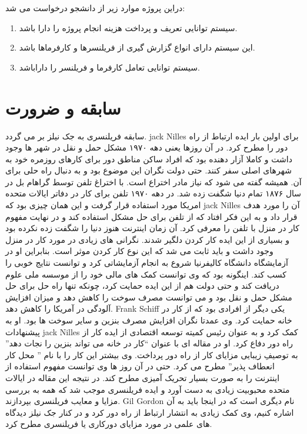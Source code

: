دراین پروژه موارد زیر از دانشجو درخواست می شد:
\begin{enumerate}
	\item
سیستم توانایی تعریف و پرداخت هزینه انجام پروژه را دارا باشد.
\item
این سیستم دارای انواع گزارش گیری از فریلنسرها و کارفرماها باشد.
\item
سیستم توانایی تعامل کارفرما و فریلنسر را داراباشد.
\end{enumerate}

\section{سابقه و ضرورت}
سابقه فریلنسری به جک نیلز بر می گردد. jack Nilles برای اولین بار ایده ارتباط از راه دور را مطرح کرد. در آن روزها یعنی دهه ۱۹۷۰ مشکل حمل و نقل در شهر ها وجود داشت و کاملا آزار دهنده بود که افراد ساکن مناطق دور برای کارهای روزمره خود به شهرهای اصلی سفر کنند. حتی دولت نگران این موضوع بود و به دنبال راه حلی برای آن. همیشه گفته می شود که نیاز مادر اختراع است.  با اختراغ تلفن توسط گراهام بل در سال ۱۸۷۶ تمام دنیا شگفت زده شد. در دهه ۱۹۷۰ تلفن برای کار در دفاتر ایالات متحده امریکا مورد استفاده قرار گرفت و این همان چیزی بود که jack Nilles آن را مورد هدف قرار داد و به این فکر افتاد که از تلفن برای حل مشکل استفاده کند و در نهایت مفهوم کار در منزل با تلفن را معرفی کرد. آن زمان اینترنت هنوز دنیا را شگفت زده نکرده بود و بسیاری از این ایده کار کردن دلگیر شدند. نگرانی های زیادی در مورد کار در منزل وجود داشت و باید ثابت می شد که این نوع کار کردن موثر است. بنابراین او در آزمایشگاه دانشگاه کالیفرنیا شروع به انجام آزمایشاتی کرد و توانست نتایج خوبی را کسب کند. اینگونه بود که وی توانست کمک های مالی خود را از موسسه ملی علوم دریافت کند و حتی دولت هم از این ایده حمایت کرد، چونکه تنها راه حل برای حل مشکل حمل و نقل بود و می توانست مصرف سوخت را کاهش دهد و میزان افزایش آلودگی در آمریکا را کاهش دهد.
Frank Schiff یکی دیگر از افرادی بود که از کار در خانه حمایت کرد. وی عمدتا نگران افزایش مصرف بنزین و سایر سوخت ها بود. او به پیشنهادات jack Nilles کمک کرد و به عنوان رئیس کمیته توسعه اقتصادی از ایده کار از راه دور دفاع کرد. او در مقاله ای با عنوان “کار در خانه می تواند بنزین را نجات دهد” به توصیفِ زیبایی مزایای کار از راه دور پرداخت. وی بیشتر این کار را با نام ” محل کار انعطاف پذیر” مطرح می کرد. حتی در آن روز ها وی توانست مفهوم استفاده از اینترنت را به صورت بسیار تحریک آمیزی مطرح کند. در نتیجه این مقاله در ایالات متحده محبوبیت زیادی به دست آورد و ایده فریلنسری موجب شد که همه به بررسی مزایا و معایب فریلنسری بپردازند. Gil Gordon نام دیگری است که در اینجا باید به آن اشاره کنیم، وی کمک زیادی به انتشار ارتباط از راه دور کرد و در کنار جک نیلز دیدگاه های علمی در مورد مزایای دورکاری یا فریلنسری مطرح کرد.
